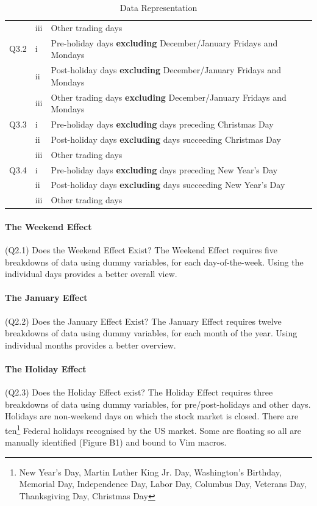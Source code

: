 \documentclass[11pt, english]{article}
\begin{document}
\begin{table}[h]
\begin{center}
\begin{tabular}{p{1.5cm}p{1.5cm}p{10cm}}
			& iii & Other trading days\\
			Q3.2 & i & Pre-holiday days \textbf{excluding} December/January Fridays and Mondays\\
			& ii & Post-holiday days \textbf{excluding} December/January Fridays and Mondays\\
			& iii & Other trading days \textbf{excluding} December/January Fridays and Mondays\\
			Q3.3 & i & Pre-holiday days \textbf{excluding} days preceding Christmas Day\\
			& ii & Post-holiday days \textbf{excluding} days succeeding Christmas Day\\
			& iii & Other trading days\\
			Q3.4 & i & Pre-holiday days \textbf{excluding} days preceding New Year’s Day\\
			& ii & Post-holiday days \textbf{excluding} days succeeding New Year’s Day\\
			& iii & Other trading days\\
			\hline
		\end{tabular}
			\caption{Data Representation}
		\end{center}
		\end{table}

			\paragraph{The Weekend Effect}

			(Q2.1) Does the Weekend Effect Exist? The Weekend Effect requires five breakdowns of data using dummy variables, for each day-of-the-week. Using the individual days provides a better overall view.

			\paragraph{The January Effect}

			(Q2.2) Does the January Effect Exist? The January Effect requires twelve breakdowns of data using dummy variables, for each month of the year. Using individual months provides a better overview.

			\paragraph{The Holiday Effect}

			(Q2.3) Does the Holiday Effect exist? The Holiday Effect requires three breakdowns of data using dummy variables, for pre/post-holidays and other days. Holidays are non-weekend days on which the stock market is closed. There are ten\footnote{New Year’s Day, Martin Luther King Jr. Day, Washington’s Birthday, Memorial Day, Independence Day, Labor Day, Columbus Day, Veterans Day, Thanksgiving Day, Christmas Day} Federal holidays recognised by the US market. Some are floating so all are manually identified (Figure B1) and bound to Vim macros.\\ 
\end{document}
